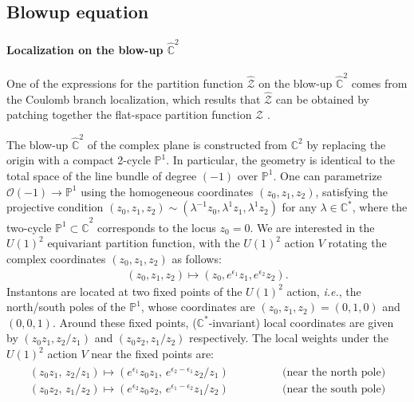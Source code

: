 \documentclass[letterpaper, 11pt]{article}
\def\IC{\mathbb{C}}
\def\IP{\mathbb{P}}
\def\e{\epsilon}
\begin{document}
\subsection{Blowup equation}

\paragraph{Localization on the blow-up $\hat{\IC}^2$}

One of the expressions for the partition function $\hat{\mathcal{Z}}$ on the blow-up $\hat{\IC}^2$ comes from the Coulomb branch localization, which results that $\hat{\mathcal{Z}}$ can be obtained by patching together the flat-space partition function $\mathcal Z$ \cite{Nekrasov:2003vi}.

The blow-up $\hat{\IC}^2$ of the complex plane is constructed from $\IC^2$ by replacing the origin with a compact 2-cycle $\IP^1$. In particular, the geometry is identical to the total space of the line bundle of degree $(-1)$ over $\IP^1$. One can parametrize $\mathcal{O}(-1)\rightarrow \IP^1$ using the homogeneous coordinates $(z_0, z_1, z_2)$, satisfying the projective condition $(z_0, z_1, z_2) \sim (\lambda^{-1}z_0, \lambda^1 z_1, \lambda^1 z_2)$ for any $\lambda \in \IC^*$, where the two-cycle  $\IP^1 \subset \hat{\IC}^2$ corresponds to the locus $z_0 = 0$. 
We are interested in the $U(1)^2$ equivariant partition function, with the $U(1)^2$ action $V$ rotating the complex coordinates $(z_0, z_1, z_2)$ as follows:
\begin{align}
  (z_0, z_1, z_2) \mapsto (z_0, e^{\e_1}z_1, e^{\e_2}z_2).
\end{align}
Instantons are located at two fixed points of the $U(1)^2$ action, \textit{i.e.}, the north/south poles of the $\mathbb{P}^1$, whose coordinates are 
$(z_0, z_1, z_2)  = (0,1,0)$ and $(0,0,1)$. Around these fixed points, ($\IC^*$-invariant) local coordinates are given by $(z_0 z_1, z_2/z_1)$ and $(z_0 z_2, z_1/z_2)$ respectively. The local weights under the $U(1)^2$ action $V$ near the fixed points are:
\begin{align}
\begin{split}
  (z_0 z_1,\,z_2/z_1) \mapsto  (e^{\e_1}z_0 z_1, \,e^{\e_2 - \e_1}z_2/z_1) & \qquad \qquad \text{(near the north pole)}\\
  (z_0 z_2,\,z_1/z_2) \mapsto (e^{\e_2}z_0 z_2, \,e^{\e_1 - \e_2}z_1/z_2) &  \qquad \qquad \text{(near the south pole)}
\end{split}
\end{align}
\end{document}

